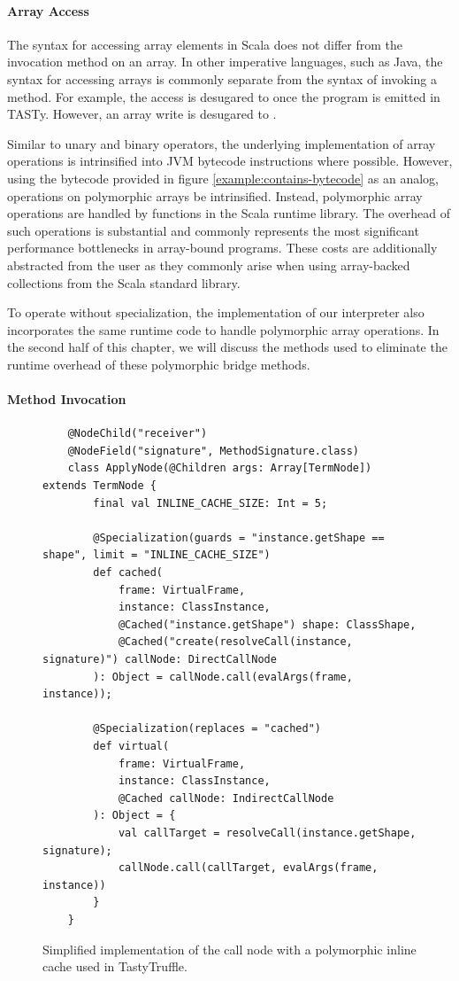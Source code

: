 \paragraph{Array Access}

The syntax for accessing array elements in Scala does not differ from the invocation method on an array.
In other imperative languages, such as Java, the syntax for accessing arrays is commonly separate from the syntax of invoking a method.
For example, the access  is desugared to  once the program is emitted in TASTy.
However, an array write  is desugared to .

Similar to unary and binary operators, the underlying implementation of array operations is intrinsified into JVM bytecode instructions where possible.
However, using the bytecode provided in figure \ref{example:contains-bytecode} as an analog, operations on polymorphic arrays  be intrinsified.
Instead, polymorphic array operations are handled by functions in the Scala runtime library.
The overhead of such operations is substantial and commonly represents the most significant performance bottlenecks in array-bound programs.
These costs are additionally abstracted from the user as they commonly arise when using array-backed collections from the Scala standard library.

To operate without specialization, the implementation of our interpreter also incorporates the same runtime code to handle polymorphic array operations.
In the second half of this chapter, we will discuss the methods used to eliminate the runtime overhead of these polymorphic bridge methods.

\paragraph{Method Invocation}

\begin{figure}[!htb]
	\begin{verbatim}
	@NodeChild("receiver")
	@NodeField("signature", MethodSignature.class)
	class ApplyNode(@Children args: Array[TermNode]) extends TermNode {
		final val INLINE_CACHE_SIZE: Int = 5;
		
		@Specialization(guards = "instance.getShape == shape", limit = "INLINE_CACHE_SIZE")
		def cached(
			frame: VirtualFrame,
			instance: ClassInstance,
			@Cached("instance.getShape") shape: ClassShape,
			@Cached("create(resolveCall(instance, signature)") callNode: DirectCallNode
		): Object = callNode.call(evalArgs(frame, instance));
		
		@Specialization(replaces = "cached")
		def virtual(
			frame: VirtualFrame,
			instance: ClassInstance,
			@Cached callNode: IndirectCallNode
		): Object = {
			val callTarget = resolveCall(instance.getShape, signature);
			callNode.call(callTarget, evalArgs(frame, instance))
		}
	}
	\end{verbatim}
	\caption{Simplified implementation of the call node with a polymorphic inline cache used in TastyTruffle.}
	\label{implementation:poly-cache-call-node}
\end{figure}

